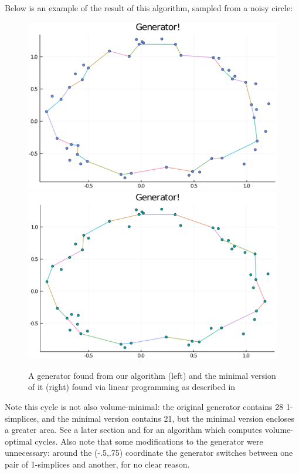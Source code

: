 Below is an example of the result of this algorithm, sampled from a noisy circle:
\begin{figure}[h]
    \centering
    \includegraphics[width = .45\textwidth]{NoisyCircleOrig.png}\includegraphics[width = .45\textwidth]{NoisyCircleMin.png}
    \caption{A generator found from our algorithm (left) and the minimal version of it (right) found via linear programming as described in \cite{Escolar2016}}
    \label{EscolarMinGen}
\end{figure}
Note this cycle is not also volume-minimal: the original generator contains 28 1-simplices, and the minimal version contains 21, but the minimal version encloses a greater area. See a later section and \cite{Obayashi2018} for an algorithm which computes volume-optimal cycles. Also note that some modifications to the generator were unnecessary: around the (-.5,.75) coordinate the generator switches between one pair of 1-simplices and another, for no clear reason.




